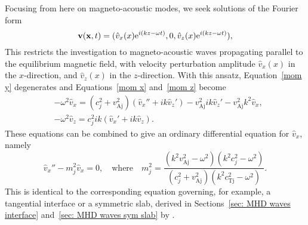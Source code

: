\documentclass[12pt,draft]{../style-files/ociamthesis}
\begin{document}
Focusing from here on magneto-acoustic modes, we seek solutions of the Fourier form
\begin{equation}
\mathbf{v}(\mathbf{x},t)=(\hat{v}_x(x)\textrm{e}^{i(kz-\omega{t})}, 0, \hat{v}_z(x)\textrm{e}^{i(kz-\omega{t})}),
\label{vcomponents}
\end{equation}
This restricts the investigation to magneto-acoustic waves propagating parallel to the equilibrium magnetic field, with velocity perturbation amplitude $\hat{v}_x(x)$ in the $x$-direction, and $\hat{v}_z(x)$ in the $z$-direction. With this ansatz, Equation~\eqref{mom y} degenerates and Equations~\eqref{mom x} and~\eqref{mom z} become
\begin{align}
&-\omega^2\hat{v}_x = (c_j^2+v_\textrm{Aj}^2)(\hat{v}_x'' + ik\hat{v}_z') - v_\textrm{Aj}^2ik\hat{v}_z'-v_\textrm{Aj}^2k^2\hat{v}_x, \label{mom x 2} \\
&-\omega^2\hat{v}_z = c_j^2ik(\hat{v}_x' + ik\hat{v}_z). \label{mom z 2}
\end{align}
These equations can be combined to give an ordinary differential equation for $\hat{v}_x$, namely
\begin{equation}
\hat{v}_x'' - m_j^2\hat{v}_x = 0, \quad \text{where} \quad
m_j^2 = \frac{(k^2v_\textrm{Aj}^2 - \omega^2)(k^2c_j^2 - \omega^2)}{(c_j^2 + v_\textrm{Aj}^2)(k^2c_\textrm{Tj}^2 - \omega^2)}. \label{v_x ODE}
\end{equation}
This is identical to the corresponding equation governing, for example, a tangential interface or a symmetric slab, derived in Sections~\ref{sec: MHD waves interface} and~\ref{sec: MHD waves sym slab} by \cite{rob81a,edw_etal82}.
\end{document}
